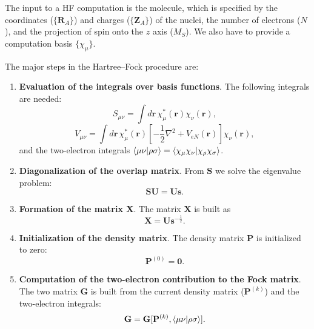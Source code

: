 \documentclass[../Main/chem532-notes.tex]{subfiles}
\begin{document}
The input to a HF computation is the molecule, which is specified by the coordinates ($\{\mathbf{R}_A\}$) and charges ($\{\mathbf{Z}_A\}$) of the nuclei, the number of electrons ($N$), and the projection of spin onto the $z$ axis ($M_S$).
We also have to provide a computation basis $\{\chi_\mu\}$.

The major steps in the Hartree--Fock procedure are:
\begin{enumerate}
\item \textbf{Evaluation of the integrals over basis functions}. The following integrals are needed:
\begin{equation}
S_{\mu\nu} = \int d\mathbf{r} \, \chi_\mu^*(\mathbf{r}) \chi_\nu(\mathbf{r}),
\end{equation}
\begin{equation}
V_{\mu\nu} = \int d\mathbf{r} \, \chi_\mu^*(\mathbf{r}) [-\frac{1}{2}\nabla^2 + V_{eN}(\mathbf{r})]\chi_\nu(\mathbf{r}),
\end{equation}
and the two-electron integrals $\braket{\mu\nu|\rho\sigma} = \braket{\chi_\mu\chi_\nu|\chi_\rho\chi_\sigma}$.

\item \textbf{Diagonalization of the overlap matrix}. From $\mathbf{S}$ we solve the eigenvalue problem:
\begin{equation}
\mathbf{SU} = \mathbf{Us}.
\end{equation}

\item \textbf{Formation of the matrix $\mathbf{X}$}. The matrix $\mathbf{X}$ is built as
\begin{equation}
\mathbf{X} = \mathbf{U}\mathbf{s}^{-\frac{1}{2}}.
\end{equation}

\item \textbf{Initialization of the density matrix}. The density matrix $\mathbf{P}$ is initialized to zero:
\begin{equation}
\mathbf{P}^{(0)} = \mathbf{0}.
\end{equation}

\item \textbf{Computation of the two-electron contribution to the Fock matrix}. The two matrix $\mathbf{G}$ is built from the current density matrix ($\mathbf{P}^{(k)}$) and the two-electron integrals:
\begin{equation}
\mathbf{G} = \mathbf{G}[\mathbf{P}^{(k)},\braket{\mu\nu|\rho\sigma}].
\end{equation}


\end{enumerate}
\end{document}
